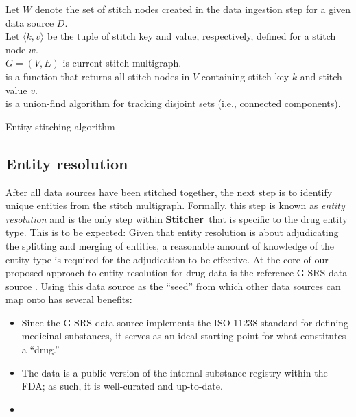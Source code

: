 \documentclass{bioinfo}
\newcommand\st{\textbf{Stitcher}}
\begin{document}
\begin{methods}
\begin{algorithm}\label{algo:stitching}
\SetAlgoLined
\DontPrintSemicolon
Let $W$ denote the set of stitch nodes created in the data ingestion
step for a given data source $D$.\\
Let $\langle k, v\rangle$ be the tuple of stitch key and value,
respectively, defined for a stitch node $w$.\\
$G=(V,E)$ is current stitch multigraph.\\
 is a function that returns all stitch nodes in $V$
containing stitch key $k$ and stitch value $v$.\\
 is a union-find algorithm for tracking disjoint sets
(i.e., connected components).\\
 \caption{Entity stitching algorithm}
\end{algorithm}

\subsection{Entity resolution}\label{sec:methods-er}
After all data sources have been stitched together, the next step is
to identify unique entities from the stitch multigraph. Formally, this
step is known as \emph{entity resolution} and is the only step
within \st\ that is specific to the drug entity type. This is to be
expected: Given that entity resolution is about adjudicating
the splitting and merging of entities, a reasonable amount of
knowledge of the entity type is required for the adjudication to be
effective. At the core of our proposed approach to entity resolution
for drug data is the reference G-SRS data source \citep{GSRSData}.
Using this data source as the ``seed'' from which other data sources
can map onto has several benefits:
\begin{itemize}
\item Since the G-SRS data source implements the ISO 11238
standard \citep{ISO11238} for defining medicinal substances, it serves
as an ideal starting point for  what constitutes a ``drug.''
\item The data is a public version of the internal substance registry
within the FDA; as such, it is well-curated and up-to-date.
\item 
\end{itemize}


\end{methods}
\end{document}
